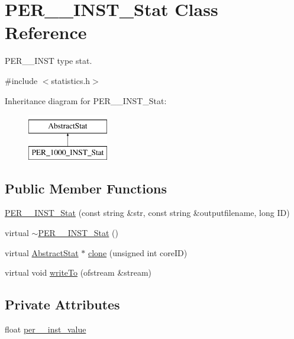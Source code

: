 \hypertarget{classPER__1000__INST__Stat}{
\section{PER\_\_\-INST\_\-Stat Class Reference}
\label{classPER__1000__INST__Stat}
}


PER\_\_\-INST type stat.  




{\ttfamily \#include $<$statistics.h$>$}

Inheritance diagram for PER\_\_\-INST\_\-Stat:\begin{figure}[H]
\begin{center}
\leavevmode
\includegraphics[height=2.000000cm]{classPER__1000__INST__Stat}
\end{center}
\end{figure}
\subsection*{Public Member Functions}
\begin{DoxyCompactItemize}
\item 
\hyperlink{classPER__1000__INST__Stat_ae928c5d8616cf8a0cd3e2721bb6a12a6}{PER\_\_\-INST\_\-Stat} (const string \&str, const string \&outputfilename, long ID)
\item 
virtual \hyperlink{classPER__1000__INST__Stat_ab68ba2b4b7f7808cd13dea3903ac85d1}{$\sim$PER\_\_\-INST\_\-Stat} ()
\item 
virtual \hyperlink{classAbstractStat}{AbstractStat} $\ast$ \hyperlink{classPER__1000__INST__Stat_aa91568b17fd503ba676dd22dfbc13e9a}{clone} (unsigned int coreID)
\item 
virtual void \hyperlink{classPER__1000__INST__Stat_adb9d735306e7c9a831c92662cfcb8824}{writeTo} (ofstream \&stream)
\end{DoxyCompactItemize}
\subsection*{Private Attributes}
\begin{DoxyCompactItemize}
\item 
float \hyperlink{classPER__1000__INST__Stat_a10fee97cef42d33172c4fc2f63bc7a71}{per\_\_\-inst\_\-value}
\end{DoxyCompactItemize}


